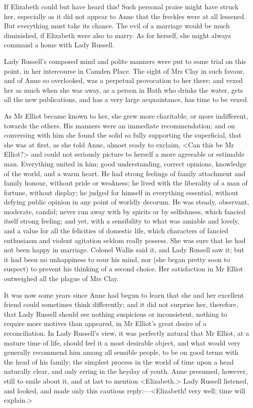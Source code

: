 If Elizabeth could but have heard this! Such personal praise might have struck her, especially as it did not appear to Anne that the freckles were at all lessened. But everything must take its chance. The evil of a marriage would be much diminished, if Elizabeth were also to marry. As for herself, she might always command a home with Lady Russell.

Lady Russell's composed mind and polite manners were put to some trial on this point, in her intercourse in Camden Place. The sight of Mrs Clay in such favour, and of Anne so overlooked, was a perpetual provocation to her there; and vexed her as much when she was away, as a person in Bath who drinks the water, gets all the new publications, and has a very large acquaintance, has time to be vexed.

As Mr Elliot became known to her, she grew more charitable, or more indifferent, towards the others. His manners were an immediate recommendation; and on conversing with him she found the solid so fully supporting the superficial, that she was at first, as she told Anne, almost ready to exclaim, <Can this be Mr Elliot?> and could not seriously picture to herself a more agreeable or estimable man. Everything united in him; good understanding, correct opinions, knowledge of the world, and a warm heart. He had strong feelings of family attachment and family honour, without pride or weakness; he lived with the liberality of a man of fortune, without display; he judged for himself in everything essential, without defying public opinion in any point of worldly decorum. He was steady, observant, moderate, candid; never run away with by spirits or by selfishness, which fancied itself strong feeling; and yet, with a sensibility to what was amiable and lovely, and a value for all the felicities of domestic life, which characters of fancied enthusiasm and violent agitation seldom really possess. She was sure that he had not been happy in marriage. Colonel Wallis said it, and Lady Russell saw it; but it had been no unhappiness to sour his mind, nor (she began pretty soon to suspect) to prevent his thinking of a second choice. Her satisfaction in Mr Elliot outweighed all the plague of Mrs Clay.

It was now some years since Anne had begun to learn that she and her excellent friend could sometimes think differently; and it did not surprise her, therefore, that Lady Russell should see nothing suspicious or inconsistent, nothing to require more motives than appeared, in Mr Elliot's great desire of a reconciliation. In Lady Russell's view, it was perfectly natural that Mr Elliot, at a mature time of life, should feel it a most desirable object, and what would very generally recommend him among all sensible people, to be on good terms with the head of his family; the simplest process in the world of time upon a head naturally clear, and only erring in the heyday of youth. Anne presumed, however, still to smile about it, and at last to mention <Elizabeth.> Lady Russell listened, and looked, and made only this cautious reply:—<Elizabeth! very well; time will explain.>

